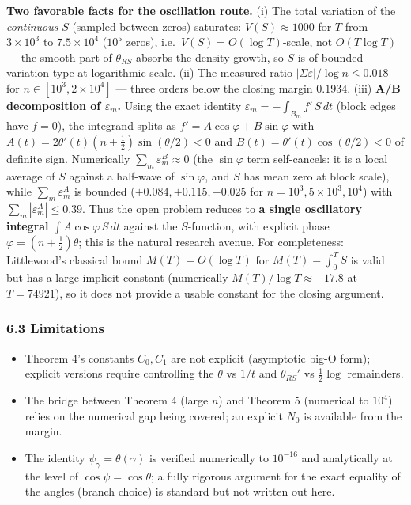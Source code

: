 \documentclass[
]{article}
\providecommand{\tightlist}{%
  \setlength{\itemsep}{0pt}\setlength{\parskip}{0pt}}
\begin{document}
\textbf{Two favorable facts for the oscillation route.} (i) The total
variation of the \emph{continuous} \(S\) (sampled between zeros)
saturates: \(V(S) \approx 1000\) for \(T\) from \(3\times10^3\) to
\(7.5\times10^4\) (\(10^5\) zeros), i.e.~\(V(S) = O(\log T)\)-scale, not
\(O(T\log T)\) --- the smooth part of \(\theta_{RS}\) absorbs the
density growth, so \(S\) is of bounded-variation type at logarithmic
scale. (ii) The measured ratio \(|\Sigma\varepsilon|/\log n \le 0.018\)
for \(n \in [10^3, 2\times10^4]\) --- three orders below the closing
margin \(0.1934\). (iii) \textbf{A/B decomposition of
\(\varepsilon_m\).} Using the exact identity
\(\varepsilon_m = -\int_{B_m} f'\,S\,dt\) (block edges have \(f=0\)),
the integrand splits as \(f' = A\cos\varphi + B\sin\varphi\) with
\(A(t) = 2\theta'(t)(n+\tfrac12)\sin(\theta/2) < 0\) and
\(B(t) = \theta'(t)\cos(\theta/2) < 0\) of definite sign. Numerically
\(\sum_m\varepsilon_m^B \approx 0\) (the \(\sin\varphi\) term
self-cancels: it is a local average of \(S\) against a half-wave of
\(\sin\varphi\), and \(S\) has mean zero at block scale), while
\(\sum_m\varepsilon_m^A\) is bounded (\(+0.084, +0.115, -0.025\) for
\(n = 10^3, 5\times10^3, 10^4\)) with
\(\sum_m|\varepsilon_m^A| \le 0.39\). Thus the open problem reduces to
\textbf{a single oscillatory integral} \(\int A\cos\varphi\,S\,dt\)
against the \(S\)-function, with explicit phase
\(\varphi = (n+\tfrac12)\theta\); this is the natural research avenue.
For completeness: Littlewood's classical bound \(M(T) = O(\log T)\) for
\(M(T)=\int_0^T S\) is valid but has a large implicit constant
(numerically \(M(T)/\log T \approx -17.8\) at \(T=74921\)), so it does
not provide a usable constant for the closing argument.

\hypertarget{limitations}{%
\subsubsection{6.3 Limitations}\label{limitations}}

\begin{itemize}
\tightlist
\item
  Theorem 4's constants \(C_0, C_1\) are not explicit (asymptotic big-O
  form); explicit versions require controlling the \(\theta\) vs \(1/t\)
  and \(\theta_{RS}'\) vs \(\tfrac12\log\) remainders.
\item
  The bridge between Theorem 4 (large \(n\)) and Theorem 5 (numerical to
  \(10^4\)) relies on the numerical gap being covered; an explicit
  \(N_0\) is available from the margin.
\item
  The identity \(\psi_\gamma = \theta(\gamma)\) is verified numerically
  to \(10^{-16}\) and analytically at the level of
  \(\cos\psi = \cos\theta\); a fully rigorous argument for the exact
  equality of the angles (branch choice) is standard but not written out
  here.
\end{itemize}
\end{document}
